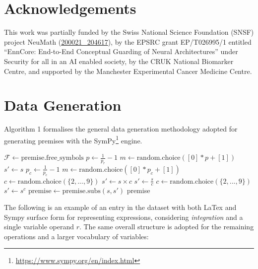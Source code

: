 \documentclass[11pt]{article}
\begin{document}
\section*{Acknowledgements}
This work was partially funded by the Swiss National Science Foundation (SNSF) project NeuMath (\href{https://data.snf.ch/grants/grant/204617}{200021\_204617}), by the EPSRC grant EP/T026995/1 entitled “EnnCore: End-to-End Conceptual Guarding of Neural Architectures” under Security for all in an AI enabled society, by the CRUK National Biomarker Centre, and supported by the Manchester Experimental Cancer Medicine Centre.



\appendix

\section{Data Generation}
\label{sec:details_generation}

Algorithm 1 formalises the general data generation methodology adopted for generating premises with the SymPy\footnote{\url{https://www.sympy.org/en/index.html}} engine. 

\begin{algorithm}[t]
\caption{Premise Generation}
\begin{algorithmic}[1]
\State $\mathcal{F} \gets \text{premise.free\_symbols}$
\State $p \gets \frac{1}{p_r} - 1$
    \State $m \gets \text{random.choice}([0]*p + [1])$
        \State $s' \gets s$
    \Else
        \State $p_c \gets \frac{1}{p_e} - 1$
        \State $m \gets \text{random.choice}([0]*p_c + [1])$
        \State $c \gets \text{random.choice}(\{2, ..., 9\})$
                \State $s' \gets s \times c$
            \Else
                \State $s' \gets \frac{s}{c}$
            \EndIf
        \Else
            \State $c \gets \text{random.choice}(\{2, ..., 9\})$
            \State $s' \gets s^c$
        \EndIf
    \EndIf
    \State $\text{premise} \gets \text{premise.subs}(s, s')$
\EndFor
\State \Return premise
\end{algorithmic}
\label{alg:randomisation}
\end{algorithm}

The following is an example of an entry in the dataset with both LaTex and Sympy surface form for representing expressions, considering \emph{integration} and a single variable operand $r$. The same overall structure is adopted for the remaining operations and a larger vocabulary of variables:
\end{document}
